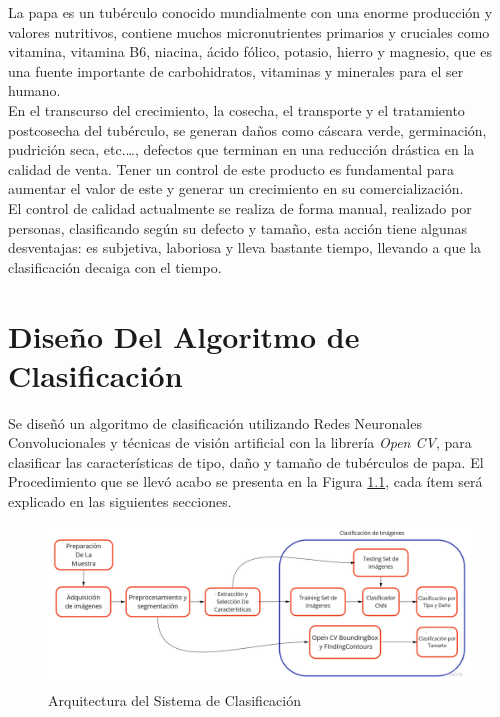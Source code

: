 La papa es un tubérculo conocido mundialmente con una enorme producción y valores nutritivos, contiene muchos micronutrientes primarios y cruciales como vitamina, vitamina B6, niacina, ácido fólico, potasio, hierro y magnesio, que es una fuente importante de carbohidratos, vitaminas y minerales para el ser humano.\\
En el transcurso del crecimiento, la cosecha, el transporte y el tratamiento postcosecha del tubérculo, se generan daños como cáscara verde, germinación, pudrición seca, etc.…, defectos que terminan en una reducción drástica en la calidad de venta. Tener un control de este producto es fundamental para aumentar el valor de este y generar un crecimiento en su comercialización.\\
El control de calidad actualmente se realiza de forma manual, realizado por personas, clasificando según su defecto y tamaño, esta acción tiene algunas desventajas: es subjetiva, laboriosa y lleva bastante tiempo, llevando a que la clasificación decaiga con el tiempo.



\chapter{Diseño Del Algoritmo de Clasificación}


Se diseñó un algoritmo de clasificación utilizando Redes Neuronales Convolucionales y técnicas de visión artificial con la librería \textit{Open CV}, para clasificar las características de tipo, daño y tamaño de tubérculos de papa. El Procedimiento que se llevó acabo se presenta en la Figura \ref{fig:flujogeneral}, cada ítem será explicado en las siguientes secciones. 


\begin{figure}[ht]
	\centering
	\includegraphics[scale=0.3]{Figs/FGGeneral.jpg}
	\caption{Arquitectura del Sistema de Clasificación}
	\label{fig:flujogeneral}
\end{figure}

